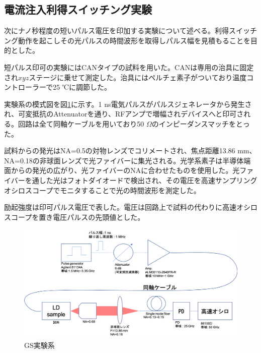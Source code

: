 \subsection{電流注入利得スイッチング実験}%
次にナノ秒程度の短いパルス電圧を印加する実験について述べる。利得スイッチング動作を起こしその光パルスの時間波形を取得しパルス幅を見積もることを目的とした。

短パルス印可の実験にはCANタイプの試料を用いた。CANは専用の治具に固定され$xyz$ステージに乗せて測定した。治具にはペルチェ素子がついており温度コントローラーで25 ℃に調節した。


実験系の模式図を図\ref{fig:fig_2_3_GS_setup}に示す。1 ns電気パルスがパルスジェネレータから発生され、可変抵抗のAttenuatorを通り、RFアンプで増幅されデバイスへと印可される。回路は全て同軸ケーブルを用いており50 $\Omega$のインピーダンスマッチをとった。

試料からの発光はNA=0.5の対物レンズでコリメートされ、焦点距離13.86 mm、NA=0.18の非球面レンズで光ファイバーに集光される。光学系素子は半導体端面からの発光の広がり、光ファイバーのNAに合わせたものを使用した。光ファイバーを通した光はフォトダイオードで検出され、その電圧を高速サンプリングオシロスコープでモニタすることで光の時間波形を測定した。

励起強度は印可パルス電圧で表した。電圧は回路上で試料の代わりに高速オシロスコープを置き電圧パルスの先頭値とした。
\begin{figure}[h]
	\includegraphics[width=15cm]{figure/fig_2_3_GS_setup.png}
	\caption{GS実験系}
	\label{fig:fig_2_3_GS_setup}
\end{figure}


